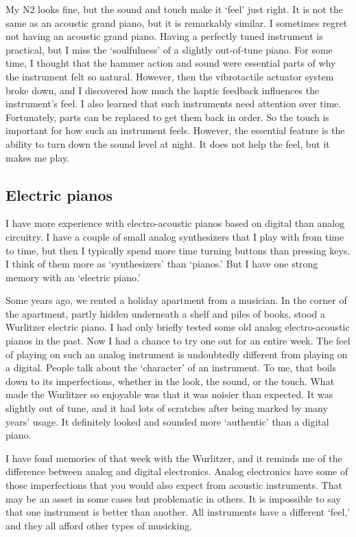 My N2 looks fine, but the sound and touch make it `feel' just right. It is not the same as an acoustic grand piano, but it is remarkably similar. I sometimes regret not having an acoustic grand piano. Having a perfectly tuned instrument is practical, but I miss the `soulfulness' of a slightly out-of-tune piano. For some time, I thought that the hammer action and sound were essential parts of why the instrument felt so natural. However, then the vibrotactile actuator system broke down, and I discovered how much the haptic feedback influences the instrument's feel. I also learned that such instruments need attention over time. Fortunately, parts can be replaced to get them back in order. So the touch is important for how such an instrument feels. However, the essential feature is the ability to turn down the sound level at night. It does not help the feel, but it makes me play.


\subsection{Electric pianos}

I have more experience with electro-acoustic pianos based on digital than analog circuitry. I have a couple of small analog synthesizers that I play with from time to time, but then I typically spend more time turning buttons than pressing keys. I think of them more as `synthesizers' than `pianos.' But I have one strong memory with an `electric piano.'

Some years ago, we rented a holiday apartment from a musician. In the corner of the apartment, partly hidden underneath a shelf and piles of books, stood a Wurlitzer electric piano. I had only briefly tested some old analog electro-acoustic pianos in the past. Now I had a chance to try one out for an entire week. The feel of playing on such an analog instrument is undoubtedly different from playing on a digital. People talk about the `character' of an instrument. To me, that boils down to its imperfections, whether in the look, the sound, or the touch. What made the Wurlitzer so enjoyable was that it was noisier than expected. It was slightly out of tune, and it had lots of scratches after being marked by many years' usage. It definitely looked and sounded more `authentic' than a digital piano.

I have fond memories of that week with the Wurlitzer, and it reminds me of the difference between analog and digital electronics. Analog electronics have some of those imperfections that you would also expect from acoustic instruments. That may be an asset in some cases but problematic in others. It is impossible to say that one instrument is better than another. All instruments have a different `feel,' and they all afford other types of musicking.


